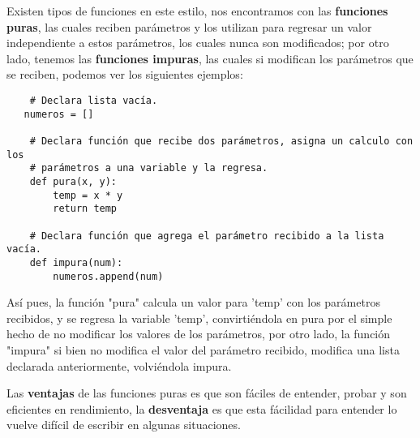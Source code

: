 Existen tipos de funciones en este estilo, nos encontramos con las \textbf{funciones puras}, las cuales reciben parámetros y los utilizan para regresar un valor independiente a estos parámetros, los cuales nunca son modificados; por otro lado, tenemos las \textbf{funciones impuras}, las cuales si modifican los parámetros que se reciben, podemos ver los siguientes ejemplos:
\begin{lstlisting}
    # Declara lista vacía.
   numeros = []

    # Declara función que recibe dos parámetros, asigna un calculo con los
    # parámetros a una variable y la regresa.
    def pura(x, y):
        temp = x * y
        return temp

    # Declara función que agrega el parámetro recibido a la lista vacía.
    def impura(num):
        numeros.append(num)
\end{lstlisting}

Así pues, la función "pura" calcula un valor para 'temp' con los parámetros recibidos, y se regresa la variable 'temp', convirtiéndola en pura por el simple hecho de no modificar los valores de los parámetros, por otro lado, la función "impura" si bien no modifica el valor del parámetro recibido, modifica una lista declarada anteriormente, volviéndola impura.

Las \textbf{ventajas} de las funciones puras es que son fáciles de entender, probar y son eficientes en rendimiento, la \textbf{desventaja} es que esta fácilidad para entender lo vuelve difícil de escribir en algunas situaciones.
